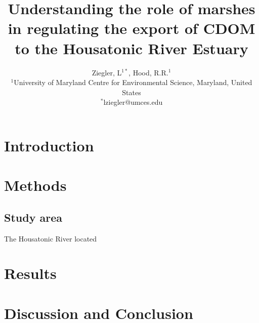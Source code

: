 \documentclass[a4, 12pt]{article}
\title{Understanding the role of marshes in regulating the export of CDOM to the Housatonic River Estuary}
\date{}
\author{%
Ziegler, L$^{1*}$, Hood, R.R.$^{1}$\\
$^{1}$University of Maryland Centre for Environmental Science, Maryland, United States\\
    $^{*}$lziegler@umces.edu
}
\makeatletter
\renewcommand{\maketitle}{\bgroup\setlength{\parindent}{0pt}
\begin{flushleft}
  \textbf{\large \@title}

  \emph{\@author}
\end{flushleft}\egroup
}
\makeatother
\begin{document}
\noindent
\maketitle
\thispagestyle{empty} %



\section*{Introduction}
\section*{Methods}
\subsection{Study area}
The Housatonic River located
\section*{Results}
\section*{Discussion and Conclusion}

\cite{lutjeharms1981features}





\end{document}
